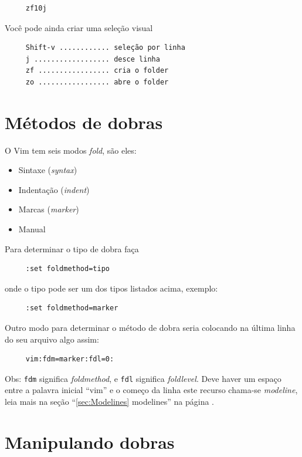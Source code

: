 \documentclass[10pt,a4paper,openany]{book}
\begin{document}
\begin{verbatim}
     zf10j
\end{verbatim}

Você pode ainda criar uma seleção visual

\begin{verbatim}
     Shift-v ............ seleção por linha
     j .................. desce linha
     zf ................. cria o folder
     zo ................. abre o folder
\end{verbatim}

\section{Métodos de dobras }
\label{Métodos de dobras }
O Vim tem seis modos {\em fold}, são eles:

\begin{itemize}
\item Sintaxe ({\em syntax})
\item Indentação ({\em indent})
\item Marcas ({\em marker})
\item Manual
\end{itemize}

Para determinar o tipo de dobra faça

\begin{verbatim}
     :set foldmethod=tipo
\end{verbatim}

onde o tipo pode ser um dos tipos listados acima, exemplo:

\begin{verbatim}
     :set foldmethod=marker
\end{verbatim}

Outro modo para determinar o método de dobra seria colocando na última
linha do seu arquivo algo assim:

\begin{verbatim}
     vim:fdm=marker:fdl=0:
\end{verbatim}

Obs: \verb|fdm| significa {\em foldmethod}, e \verb|fdl| significa
{\em foldlevel}. Deve haver um espaço entre a palavra inicial ``vim'' e o
começo da linha este recurso chama-se {\em modeline}, leia mais na seção
``\ref{sec:Modelines} modelines'' na página \pageref{sec:Modelines}.

\section{Manipulando dobras }\label{Manipulando dobras }
\end{document}
